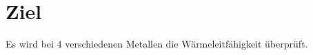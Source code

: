 \section{Ziel}
\label{sec:ziel}

Es wird bei 4 verschiedenen Metallen die Wärmeleitfähigkeit überprüft.
